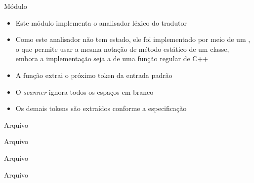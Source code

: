 \begin{frame}[fragile]{Módulo }

    \begin{itemize}
        \item Este módulo implementa o analisador léxico do tradutor
        \pause

        \item Como este analisador não tem estado, ele foi implementado por meio de um , o que permite usar a mesma notação de método
            estático de um classe, embora a implementação seja a de uma função regular de C++
        \pause

        \item A função  extrai o próximo token da entrada padrão
        \pause

        \item O \textit{scanner} ignora todos os espaços em branco
        \pause

        \item Os demais tokens são extraídos conforme a especificação
    \end{itemize}

\end{frame}

\begin{frame}[fragile]{Arquivo }
\end{frame}

\begin{frame}[fragile]{Arquivo }
\end{frame}

\begin{frame}[fragile]{Arquivo }
\end{frame}

\begin{frame}[fragile]{Arquivo }
\end{frame}

